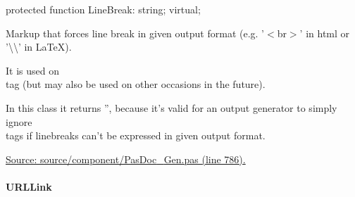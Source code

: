 \documentclass{report}
\newif\ifpdf
\begin{document}
\label{PasDoc_Gen.TDocGenerator-LineBreak}
\begin{list}{}{
\setlength{\itemindent}{0cm}
\setlength{\listparindent}{0cm}
\setlength{\leftmargin}{\evensidemargin}
\addtolength{\leftmargin}{\tmplength}
\settowidth{\labelsep}{X}
\addtolength{\leftmargin}{\labelsep}
\setlength{\labelwidth}{\tmplength}
}
\item[\textbf{Declaration}\hfill]
\ifpdf
\begin{flushleft}
\fi
\begin{ttfamily}
protected function LineBreak: string; virtual;\end{ttfamily}

\ifpdf
\end{flushleft}
\fi

\par
\item[\textbf{Description}]
Markup that forces line break in given output format (e.g. '{$<$}br{$>$}' in html or '{\textbackslash}{\textbackslash}' in LaTeX).\hfill\vspace*{1ex}



It is used on \\{} tag (but may also be used on other occasions in the future).

In this class it returns '', because it's valid for an output generator to simply ignore \\{} tags if linebreaks can't be expressed in given output format.\par
\href{https://github.com/pasdoc/pasdoc/blob/master/source/component/PasDoc_Gen.pas#L786}{Source: source/component/PasDoc{\_}Gen.pas (line 786).}

\end{list}
\paragraph*{URLLink}\hspace*{\fill}
\end{document}
